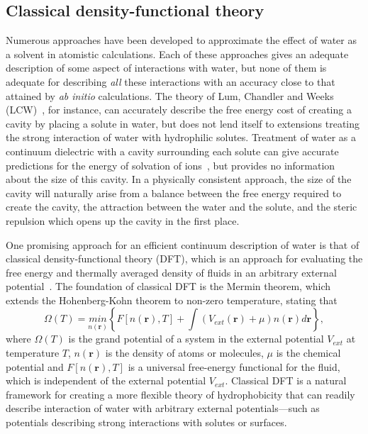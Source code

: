 \documentclass[twocolumn,amsmath,amssymb,prb]{revtex4-1}
\newcommand{\rr}{\textbf{r}}
\begin{document}
\subsection{Classical density-functional theory}

Numerous approaches have been developed to approximate the effect of water
as a solvent in atomistic calculations.  Each of these approaches gives an
adequate description of some aspect of interactions with water, but none of
them is adequate for describing \emph{all} these interactions with an
accuracy close to that attained by \emph{ab initio} calculations.  The
theory of Lum, Chandler and Weeks (LCW)~\cite{lum1999hydrophobicity}, for 
instance, can
accurately describe the free energy cost of creating a cavity by placing a
solute in water, but does not lend itself to extensions treating the strong
interaction of water with hydrophilic solutes.  Treatment of water as a
continuum dielectric with a cavity surrounding each solute can give
accurate predictions for the energy of solvation of ions~\cite{latimer1939,
rashin1985, zhan1998, hsu1999, hildebrandt2004, hildebrandt2007}, but
provides no information about the size of this cavity.  In a physically
consistent approach, the size of the cavity will naturally arise from a
balance between the free energy required to create the cavity, the
attraction between the water and the solute, and the steric repulsion which
opens up the cavity in the first place.

One promising approach for an efficient continuum description of water
is that of classical density-functional theory (DFT), which is an
approach for evaluating the free energy and thermally averaged density
of fluids in an arbitrary external potential~\cite{ebner1976density}.
The foundation of classical DFT is the Mermin
theorem\cite{mermin1965thermal}, which extends the Hohenberg-Kohn
theorem\cite{hohenberg1964inhomogeneous} to non-zero temperature,
stating that
\begin{equation}
  \Omega (T) = \underset{n(\rr)}{min}\left\{ F[n(\rr),T] + \int (V_\textit{ext}(\rr) +\mu)n(\rr)
d\rr\right\},
\end{equation}
where $\Omega (T)$ is the grand potential of a system in the external
potential $V_\textit{ext}$ at temperature $T$, $n(\rr)$ is the density
of atoms or molecules, $\mu$ is the chemical potential and
$F[n(\rr),T]$ is a universal free-energy functional for the fluid,
which is independent of the external potential $V_\textit{ext}$.
Classical DFT is a natural framework for creating a more flexible
theory of hydrophobicity that can readily describe interaction of
water with arbitrary external potentials---such as potentials
describing strong interactions with solutes or surfaces.
\end{document}
